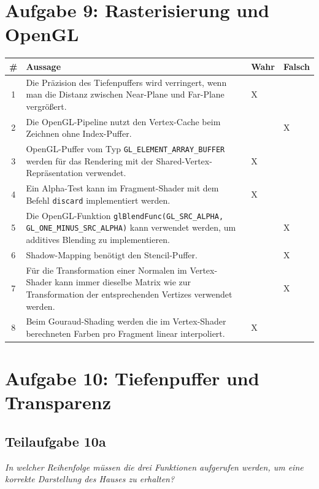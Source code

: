 \documentclass[a4paper]{scrartcl}
\begin{document}
\section*{Aufgabe 9: Rasterisierung und OpenGL}
\begin{table}[H]
    \begin{tabular}{cp{12cm}ll}
    \toprule
    \# & \textbf{Aussage} & \textbf{Wahr} & \textbf{Falsch} \\\midrule
    1  & Die Präzision des Tiefenpuffers wird verringert, wenn man die Distanz zwischen Near-Plane und Far-Plane vergrößert.                                    & X &  \\
    2  & Die OpenGL-Pipeline nutzt den Vertex-Cache beim Zeichnen ohne Index-Puffer. & & X   \\
    3  & OpenGL-Puffer vom Typ \texttt{GL\_ELEMENT\_ARRAY\_BUFFER} werden für das Rendering mit der Shared-Vertex-Repräsentation verwendet.                            & X &  \\
    4  & Ein Alpha-Test kann im Fragment-Shader mit dem Befehl \texttt{discard} implementiert werden.                                                                    & X & \\
    5  & Die OpenGL-Funktion \texttt{glBlendFunc(GL\_SRC\_ALPHA, GL\_ONE\_MINUS\_SRC\_ALPHA)} kann verwendet werden, um additives Blending zu implementieren.           & & X \\
    6  & Shadow-Mapping benötigt den Stencil-Puffer.                                                                                                             & & X \\
    7  & Für die Transformation einer Normalen im Vertex-Shader kann immer dieselbe Matrix wie zur Transformation der entsprechenden Vertizes verwendet werden. & & X \\
    8  & Beim Gouraud-Shading werden die im Vertex-Shader berechneten Farben pro Fragment linear interpoliert.                                                   & X & \\\bottomrule
    \end{tabular}
\end{table}

\section*{Aufgabe 10: Tiefenpuffer und Transparenz}
\subsection*{Teilaufgabe 10a}
\textit{In welcher Reihenfolge müssen die drei Funktionen aufgerufen werden, um
eine korrekte Darstellung des Hauses zu erhalten?}
\end{document}
